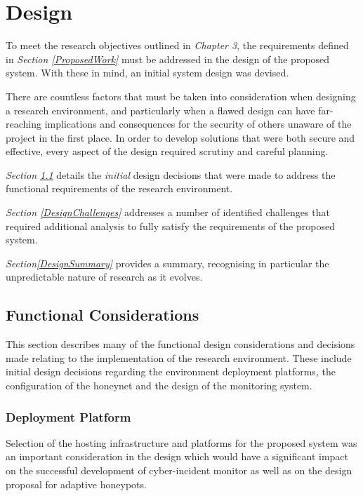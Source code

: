 
\chapter{Design} \label{Chapter4}

To meet the research objectives outlined in \textit{Chapter 3}, the requirements defined in \textit{Section \ref{ProposedWork}} must be addressed in the design of the proposed system. With these in mind, an initial system design was devised. 

There are countless factors that must be taken into consideration when designing a research environment, and particularly when a flawed design can have far-reaching implications and consequences for the security of others unaware of the project in the first place. In order to develop solutions that were both secure and effective, every aspect of the design required scrutiny and careful planning. 


\textit{Section \ref{FunctionalConsiderations}} details the \textit{initial} design decisions that were made to address the functional requirements of the research environment.

\textit{Section \ref{DesignChallenges}} addresses a number of identified challenges that required additional analysis to fully satisfy the requirements of the proposed system.

\textit{Section\ref{DesignSummary}} provides a summary, recognising in particular the unpredictable nature of research as it evolves. 

\section{Functional Considerations} \label{FunctionalConsiderations}
This section describes many of the functional design considerations and decisions made relating to the implementation of the research environment. These include initial design decisions regarding the environment deployment platforms, the configuration of the honeynet and the design of the monitoring system.

\subsection{Deployment Platform}
Selection of the hosting infrastructure and platforms for the proposed system was an important consideration in the design which would have a significant impact on the successful development of cyber-incident monitor as well as on the design proposal for adaptive honeypots.

